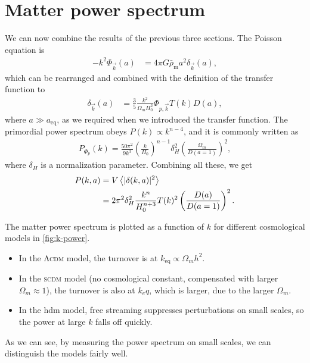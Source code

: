 \section{Matter power spectrum}
We can now combine the results of the previous three sections.
The Poisson equation is
\begin{align*}
	- k^2 \Phi_{\vec{k}}(a)
	&= 4 \pi G \bar{\rho}_\text{m} a^2 \delta_{\vec{k}}(a),
\end{align*}
which can be rearranged and combined with the definition of the transfer function to
\begin{align*}
	\delta_{\vec{k}}(a)
	&= \frac{3}{5} \frac{k^2}{\Omega_m H_0^2} \Phi_{p, \vec{k}} T(k) D(a),
\end{align*}
where $a \gg a_\text{eq}$, as we required when we introduced the transfer function.
The primordial power spectrum obeys $P(k) \propto k^{n-4}$, and it is commonly written as
\begin{align*}
	P_{\Phi_p}(k) = \frac{50 \pi^2}{9 k^3} 
	\left( \frac{k}{H_0} \right)^{n-1}
	\delta_{H}^2 
	\left( \frac{\Omega_m}{D(a=1)} \right)^2,
\end{align*}
where $\delta_H$ is a normalization parameter.
Combining all these, we get
\begin{align*}
	P(k,a)
	&= V \left\langle \vert\delta(k,a)\vert^2 \right\rangle\\
	&= 2 \pi^2 \delta_H^2 
	\frac{k^n}{H_0^{n+3}}
	T(k)^2
	\left( \frac{D(a)}{D(a=1)} \right)^2.
\end{align*}

The matter power spectrum is plotted as a function of $k$ for different cosmological models in \cref{fig:k-power}.
\begin{itemize}
	\item In the \textsc{Λcdm} model, the turnover is at $k_\text{eq} \propto \Omega_m h^2$.
	\item In the \textsc{scdm} model (no cosmological constant, compensated with larger $\Omega_m \approx 1$), the turnover is also at $k_eq$, which is larger, due to the larger $\Omega_m$.
	\item In the \ac{hdm} model, free streaming suppresses perturbations on small scales, so the power at large $k$ falls off quickly.
\end{itemize}
As we can see, by measuring the power spectrum on small scales, we can distinguish the models fairly well.

